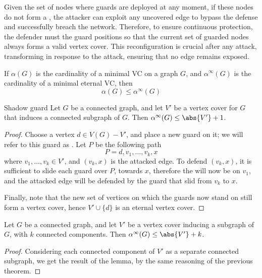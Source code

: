 \documentclass[a4paper, 12pt]{report}
\begin{document}
    Given the set of nodes where guards are deployed at any moment, if these nodes do not form a , the attacker can exploit any uncovered edge to bypass the defense and successfully breach the network. Therefore, to ensure continuous protection, the defender must  the guard positions so that the current set of guarded nodes always forms a valid vertex cover. This reconfiguration is crucial after any attack, transforming  in response to the attack, ensuring that no edge remains exposed.

    If $\alpha (G)$ is the cardinality of a minimal VC on a graph $G$, and $\alpha ^{\infty}(G)$ is the cardinality of a minimal eternal VC, then $$\alpha(G) \le \alpha^{\infty}(G)$$

    \begin{framedthm}{Shadow guard}
        Let $G$ be a connected graph, and let $V'$ be a vertex cover for $G$ that induces a connected subgraph of $G$. Then $\alpha^{\infty}(G) \le \abs{V'} + 1$.
    \end{framedthm}

    \begin{proof}
        Choose a vertex $d \in V(G) - V'$, and place a new guard on it; we will refer to this guard as . Let $P$ be the following path $$P = d, v_1, \ldots, v_k, x$$ where $v_1, \ldots, v_k \in V'$, and $(v_k, x)$ is the attacked edge. To defend $(v_k, x)$, it is sufficient to slide each guard over $P$, towards $x$, therefore the  will now be on $v_1$, and the attacked edge will be defended by the guard that slid from $v_k$ to $x$.

        Finally, note that the new set of vertices on which the guards now stand on still form a vertex cover, hence $V' \cup \{d\}$ is an eternal vertex cover.
    \end{proof}

    \begin{framedlem}{}
        Let $G$ be a connected graph, and let $V'$ be a vertex cover inducing a subgraph of $G$, with $k$ connected components. Then $\alpha^{\infty}(G) \le \abs{V'} + k$.
    \end{framedlem}

    \begin{proof}
        Considering each connected component of $V'$ as a separate connected subgraph, we get the result of the lemma, by the same reasoning of the previous theorem.
    \end{proof}
\end{document}
